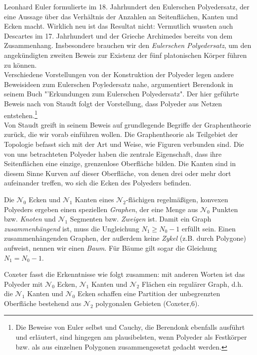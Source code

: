 Leonhard Euler formulierte im 18. Jahrhundert den Eulerschen Polyedersatz, der eine Aussage über das Verhältnis der Anzahlen an Seitenflächen, Kanten und Ecken macht. Wirklich neu ist das Resultat nicht: Vermutlich wussten auch Descartes im 17. Jahrhundert und der Grieche Archimedes bereits von dem Zusammenhang. Insbesondere brauchen wir den \textit{Eulerschen Polyedersatz}, um den angekündigten zweiten Beweis zur Existenz der fünf platonischen Körper führen zu können.\\
Verschiedene Vorstellungen von der Konstruktion der Polyeder legen andere Beweisideen zum Eulerschen Poyledersatz nahe, argumentiert Berendonk in seinem Buch "'Erkundungen zum Eulerschen Polyedersatz". \citep[vgl.][39]{Berendonk2014} Der hier geführte Beweis nach von Staudt folgt der Vorstellung, dass Polyeder aus Netzen entstehen.\footnote{Die Beweise von Euler selbst und Cauchy, die Berendonk ebenfalls ausführt und erläutert, sind hingegen am plausibelsten, wenn Polyeder als Festkörper bzw. als aus einzelnen Polygonen zusammengesetzt gedacht werden.}\\
Von Staudt greift in seinem Beweis auf grundlegende Begriffe der Graphentheorie zurück, die wir vorab einführen wollen. Die Graphentheorie als Teilgebiet der Topologie befasst sich mit der Art und Weise, wie Figuren verbunden sind. Die von uns betrachteten Polyeder haben die zentrale Eigenschaft, dass ihre Seitenflächen eine einzige, grenzenlose Oberfläche bilden. Die Kanten sind in diesem Sinne Kurven auf dieser Oberfläche, von denen drei oder mehr dort aufeinander treffen, wo sich die Ecken des Polyeders befinden. 
\begin{bem} 
Die $\mathcal{N}_0$ Ecken und $\mathcal{N}_1$ Kanten eines $\mathcal{N}_2$-flächigen regelmäßigen, konvexen Polyeders ergeben einen speziellen \textit{Graphen}, der eine Menge aus $\mathcal{N}_0$ Punkten bzw. \textit{Knoten} und $\mathcal{N}_1$ Segmenten bzw. \textit{Zweigen} ist. Damit ein Graph \textit{zusammenhängend} ist, muss die Ungleichung $N_{1} \geq N_{0}-1$ erfüllt sein. 
Einen zusammenhängenden Graphen, der außerdem keine \textit{Zykel} (z.B. durch Polygone) aufweist, nennen wir einen \textit{Baum}. Für Bäume gilt sogar die Gleichung $N_{1} = N_{0}-1$. 
\end{bem}
Coxeter fasst die Erkenntnisse wie folgt zusammen: mit anderen Worten ist das Polyeder mit $\mathcal{N}_0$ Ecken, $\mathcal{N}_1$ Kanten und $\mathcal{N}_2$ Flächen ein regulärer Graph, d.h. die $\mathcal{N}_1$ Kanten und $\mathcal{N}_0$ Ecken schaffen eine Partition der unbegrenzten Oberfläche bestehend aus $\mathcal{N}_2$ polygonalen Gebieten (Coxeter,6).\\
